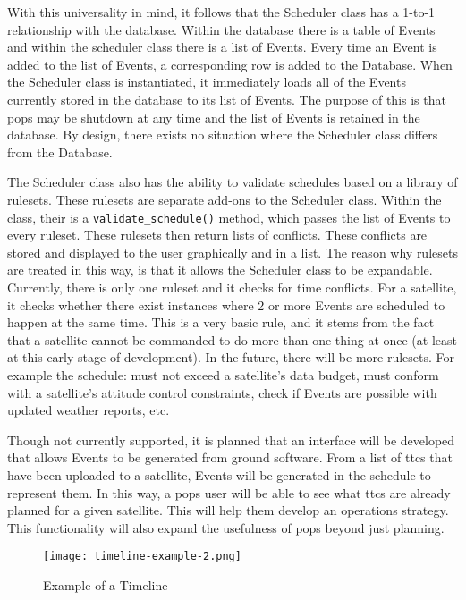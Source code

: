 With this universality in mind, it follows that the Scheduler class has a
1-to-1 relationship with the database. Within the database there is a table of
Events and within the scheduler class there is a list of Events. Every time an
Event is added to the list of Events, a corresponding row is added to the
Database. When the Scheduler class is instantiated, it immediately loads all of
the Events currently stored in the database to its list of Events. The purpose
of this is that \gls{pops} may be shutdown at any time and the list of Events
is retained in the database. By design, there exists no situation where the
Scheduler class differs from the Database.

The Scheduler class also has the ability to validate schedules based on a
library of rulesets. These rulesets are separate add-ons to the Scheduler
class. Within the class, their is a \texttt{validate\_schedule()} method, which
passes the list of Events to every ruleset. These rulesets then return lists of
conflicts. These conflicts are stored and displayed to the user graphically and
in a list. The reason why rulesets are treated in this way, is that it allows
the Scheduler class to be expandable. Currently, there is only one ruleset and
it checks for time conflicts. For a satellite, it checks whether there exist
instances where 2 or more Events are scheduled to happen at the same time.
This is a very basic rule, and it stems from the fact that a satellite cannot
be commanded to do more than one thing at once (at least at this early stage of
development).  In the future, there will be more rulesets.  For example the
schedule: must not exceed a satellite's data budget, must conform with a
satellite's attitude control constraints, check if Events are possible with
updated weather reports, etc.

Though not currently supported, it is planned that an interface will be
developed that allows Events to be generated from ground software. From a list
of \glspl{ttc} that have been uploaded to a satellite, Events will be generated
in the schedule to represent them. In this way, a \gls{pops} user will be able
to see what \glspl{ttc} are already planned for a given satellite. This will
help them develop an operations strategy. This functionality will also expand
the usefulness of \gls{pops} beyond just planning.

\begin{figure} [h]
    \centering
    \texttt{[image: timeline-example-2.png]} 
    \caption{Example of a Timeline}
    \label{fig:scheduler-timeline}
\end{figure}

